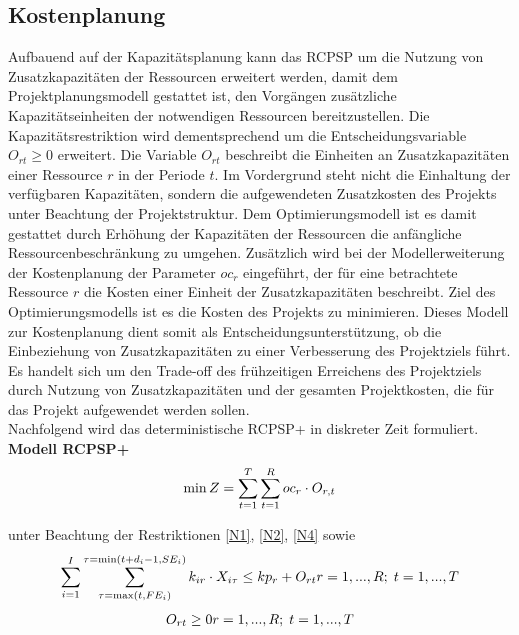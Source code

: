 \documentclass[a4paper,12pt,parskip,bibtotoc,liststotoc]{article}
\begin{document}
\subsection{Kostenplanung}
Aufbauend auf der Kapazitätsplanung kann das RCPSP um die Nutzung von Zusatzkapazitäten der Ressourcen erweitert werden, damit dem Projektplanungsmodell gestattet ist, den Vorgängen zusätzliche Kapazitätseinheiten der notwendigen Ressourcen bereitzustellen. Die Kapazitätsrestriktion wird dementsprechend um die Entscheidungsvariable $O_{rt} \geq 0$ erweitert. Die Variable $O_{rt}$ beschreibt die Einheiten an Zusatzkapazitäten einer Ressource $r$ in der Periode $t$. Im Vordergrund steht nicht die Einhaltung der verfügbaren Kapazitäten, sondern die aufgewendeten Zusatzkosten des Projekts unter Beachtung der Projektstruktur. Dem Optimierungsmodell ist es damit gestattet durch Erhöhung der Kapazitäten der Ressourcen die anfängliche Ressourcenbeschränkung zu umgehen. Zusätzlich wird bei der Modellerweiterung der Kostenplanung der Parameter $oc_r$ eingeführt, der für eine betrachtete Ressource $r$ die Kosten einer Einheit der Zusatzkapazitäten beschreibt. Ziel des Optimierungsmodells ist es die Kosten des Projekts zu minimieren. Dieses Modell zur Kostenplanung dient somit als Entscheidungsunterstützung, ob die Einbeziehung von Zusatzkapazitäten zu einer Verbesserung des Projektziels führt. Es handelt sich um den Trade-off des frühzeitigen Erreichens des Projektziels durch Nutzung von Zusatzkapazitäten und der gesamten Projektkosten, die für das Projekt aufgewendet werden sollen.\\

Nachfolgend wird das deterministische RCPSP+ in diskreter Zeit formuliert.\\

\textbf{Modell RCPSP+}
\begin{eqnarray} \label{Ziel2}
\min Z = \sum_{t=1}^{T}\sum_{t=1}^{R} oc_{r} \cdot O_{r,t}\hfill  
\end{eqnarray}

unter Beachtung der Restriktionen \eqref{N1}, \eqref{N2}, \eqref{N4} sowie
\begin{multline} \label{N5}
\sum_{i=1}^{I}\sum_{\tau=\max(t,FE_{i})}^{\tau=\min(t+d_i-1,SE_i)}k_ {ir} \cdot X_{i\tau} \leq kp_{r} + O_{rt}
\hfill   r =1,...,R;\; t=1,...,T
\end{multline}\vspace{-3.0ex}
\begin{multline} \label{N6}
O_{rt} \geq 0
\hfill   r =1,...,R;\; t=1,...,T \end{multline}\vspace{-6.0ex}\\
\end{document}
